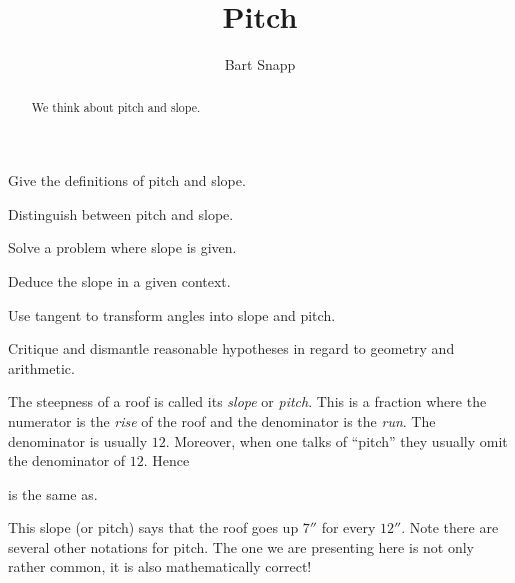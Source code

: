 \documentclass[noauthor,nooutcomes,hints,handout,12pt]{ximera}
\title{Pitch}
\author{Bart Snapp}
\begin{document}
\begin{abstract}
  We think about pitch and slope.
\end{abstract}
\maketitle

\begin{listOutcomes}
\item Give the definitions of pitch and slope.
\item Distinguish between pitch and slope.
\item Solve a problem where slope is given.
\item Deduce the slope in a given context.
\item Use tangent to transform angles into slope and pitch.
\item Critique and dismantle reasonable hypotheses in regard to geometry and arithmetic.
\end{listOutcomes}



The steepness of a roof is called its \textit{slope} or
\textit{pitch}. This is a fraction where the numerator is the
\textit{rise} of the roof and the denominator is the \textit{run}. The
denominator is usually $12$. Moreover, when one talks of ``pitch''
they usually omit the denominator of $12$. Hence
\begin{center}
\quad is the same as\quad {}.
\end{center}
This slope (or pitch) says that the roof goes up $7''$ for every
$12''$. Note there are several other notations for pitch. The one we
are presenting here is not only rather common, it is also
mathematically correct!

\mynewpage
\end{document}
